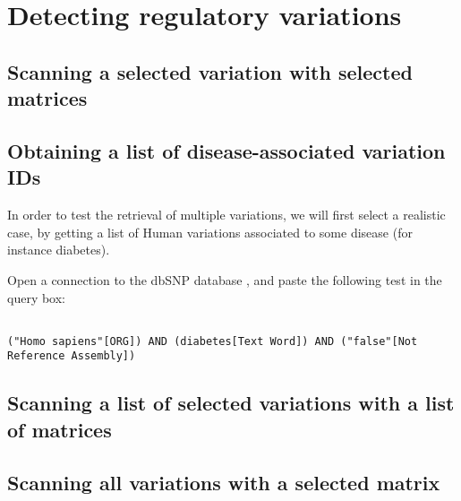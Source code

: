 

\section{Detecting regulatory variations}

\subsection{Scanning a selected variation with selected matrices}

\tbw

\subsection{Obtaining a list of disease-associated variation IDs}

In order to test the retrieval of multiple variations, we will first
select a realistic case, by getting a list of Human variations
associated to some disease (for instance diabetes).

Open a connection to the dbSNP database
, and paste the following
test in the query box:

\begin{lstlisting}

("Homo sapiens"[ORG]) AND (diabetes[Text Word]) AND ("false"[Not Reference Assembly])
\end{lstlisting}

\tbw


\subsection{Scanning a list of selected variations with a list of matrices}

\tbw

\subsection{Scanning all variations with a selected matrix}

\tbw



